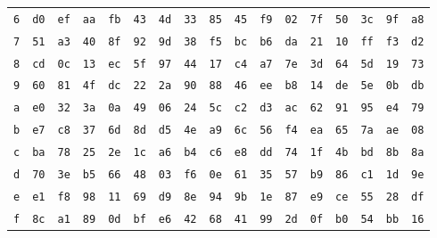 \begin{longtable}{c*{16}{c}}
\texttt{6} & \texttt{d0} & \texttt{ef} & \texttt{aa} & \texttt{fb} & \texttt{43} & \texttt{4d} & \texttt{33} & \texttt{85} & \texttt{45} & \texttt{f9} & \texttt{02} & \texttt{7f} & \texttt{50} & \texttt{3c} & \texttt{9f} & \texttt{a8} \\
\texttt{7} & \texttt{51} & \texttt{a3} & \texttt{40} & \texttt{8f} & \texttt{92} & \texttt{9d} & \texttt{38} & \texttt{f5} & \texttt{bc} & \texttt{b6} & \texttt{da} & \texttt{21} & \texttt{10} & \texttt{ff} & \texttt{f3} & \texttt{d2} \\
\texttt{8} & \texttt{cd} & \texttt{0c} & \texttt{13} & \texttt{ec} & \texttt{5f} & \texttt{97} & \texttt{44} & \texttt{17} & \texttt{c4} & \texttt{a7} & \texttt{7e} & \texttt{3d} & \texttt{64} & \texttt{5d} & \texttt{19} & \texttt{73} \\
\texttt{9} & \texttt{60} & \texttt{81} & \texttt{4f} & \texttt{dc} & \texttt{22} & \texttt{2a} & \texttt{90} & \texttt{88} & \texttt{46} & \texttt{ee} & \texttt{b8} & \texttt{14} & \texttt{de} & \texttt{5e} & \texttt{0b} & \texttt{db} \\
\texttt{a} & \texttt{e0} & \texttt{32} & \texttt{3a} & \texttt{0a} & \texttt{49} & \texttt{06} & \texttt{24} & \texttt{5c} & \texttt{c2} & \texttt{d3} & \texttt{ac} & \texttt{62} & \texttt{91} & \texttt{95} & \texttt{e4} & \texttt{79} \\
\texttt{b} & \texttt{e7} & \texttt{c8} & \texttt{37} & \texttt{6d} & \texttt{8d} & \texttt{d5} & \texttt{4e} & \texttt{a9} & \texttt{6c} & \texttt{56} & \texttt{f4} & \texttt{ea} & \texttt{65} & \texttt{7a} & \texttt{ae} & \texttt{08} \\
\texttt{c} & \texttt{ba} & \texttt{78} & \texttt{25} & \texttt{2e} & \texttt{1c} & \texttt{a6} & \texttt{b4} & \texttt{c6} & \texttt{e8} & \texttt{dd} & \texttt{74} & \texttt{1f} & \texttt{4b} & \texttt{bd} & \texttt{8b} & \texttt{8a} \\
\texttt{d} & \texttt{70} & \texttt{3e} & \texttt{b5} & \texttt{66} & \texttt{48} & \texttt{03} & \texttt{f6} & \texttt{0e} & \texttt{61} & \texttt{35} & \texttt{57} & \texttt{b9} & \texttt{86} & \texttt{c1} & \texttt{1d} & \texttt{9e} \\
\texttt{e} & \texttt{e1} & \texttt{f8} & \texttt{98} & \texttt{11} & \texttt{69} & \texttt{d9} & \texttt{8e} & \texttt{94} & \texttt{9b} & \texttt{1e} & \texttt{87} & \texttt{e9} & \texttt{ce} & \texttt{55} & \texttt{28} & \texttt{df} \\
\texttt{f} & \texttt{8c} & \texttt{a1} & \texttt{89} & \texttt{0d} & \texttt{bf} & \texttt{e6} & \texttt{42} & \texttt{68} & \texttt{41} & \texttt{99} & \texttt{2d} & \texttt{0f} & \texttt{b0} & \texttt{54} & \texttt{bb} & \texttt{16} \\
\end{longtable}
\endgroup
